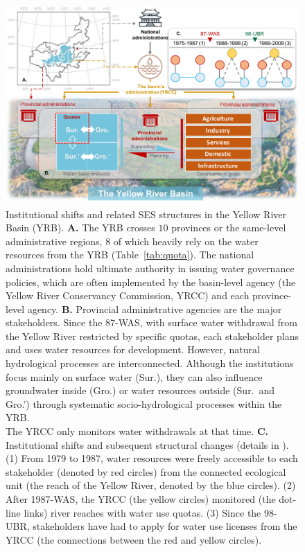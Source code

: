 \documentclass[preprint, 12pt]{elsarticle}
\begin{document}
\begin{figure}[!t]
	\includegraphics[width=\linewidth]{diagrams/diagram.pdf}
	\caption{
		Institutional shifts and related SES structures in the Yellow River Basin (YRB).
		\textbf{A.} The YRB crosses $10$ provinces or the same-level administrative regions, $8$ of which heavily rely on the water resources from the YRB (Table~\ref{tab:quota}). The national administrations hold ultimate authority in issuing water governance policies, which are often implemented by the basin-level agency (the Yellow River Conservancy Commission, YRCC) and each province-level agency.
		\textbf{B.} Provincial administrative agencies are the major stakeholders. Since the 87-WAS, with surface water withdrawal from the Yellow River restricted by specific quotas, each stakeholder plans and uses water resources for development. However, natural hydrological processes are interconnected. Although the institutions focus mainly on surface water (Sur.), they can also influence groundwater inside (Gro.) or water resources outside (Sur.\ and Gro.') through systematic socio-hydrological processes within the YRB.\\ The YRCC only monitors water withdrawals at that time.
		\textbf{C.} Institutional shifts and subsequent structural changes (details in \textit{}). (1) From 1979 to 1987, water resources were freely accessible to each stakeholder (denoted by red circles) from the connected ecological unit (the reach of the Yellow River, denoted by the blue circles). (2) After 1987-WAS, the YRCC (the yellow circles) monitored (the dot-line links) river reaches with water use quotas. (3) Since the 98-UBR, stakeholders have had to apply for water use licenses from the YRCC (the connections between the red and yellow circles).
	}\label{fig:structure}
\end{figure}
\end{document}
